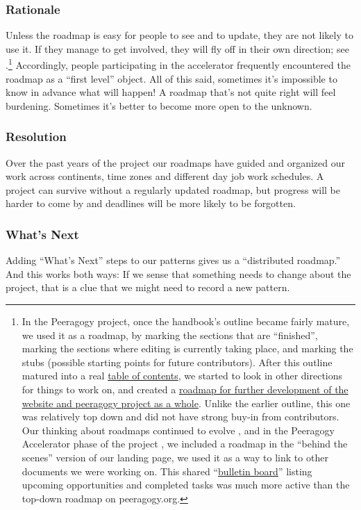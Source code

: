 \subsubsection*{Rationale} Unless the roadmap is easy for people to see and to
update, they are not likely to use it.  If they manage to get involved, they will fly off in their own direction; see .\footnote{In the Peeragogy project, once the handbook's outline became fairly mature, we used it as a roadmap, by marking the sections that are ``finished'', marking the sections where editing is currently taking place, and marking the stubs (possible starting points for future contributors). After this outline matured into a real \href{http://peeragogy.org/table-of-contents/}{table of contents}, we started to look in other directions for things to work on, and created a \href{http://peeragogy.org/peeragogy-org-roadmap/}{roadmap for further development of the website and peeragogy project as a whole}.  Unlike the earlier outline, this one was relatively top down and did not have strong buy-in from contributors.  Our thinking about roadmaps continued to evolve \cite{corneli2013roadmaps}, and in the Peeragogy Accelerator phase of the project \cite{building-peeragogy-accelerator}, we included a roadmap in the ``behind the scenes'' version of our landing page, we used it as a way to link to other documents we were working on.  This shared ``\href{https://docs.google.com/document/d/1RZEsqFDwF-jPiCvgWzJgi6n6faTRTDuPQS1CMEeXxRE/edit\#heading=h.p197njr3jsn8}{bulletin board}'' listing upcoming opportunities and completed tasks was much more active than the top-down roadmap on peeragogy.org.}  Accordingly, people participating in the accelerator frequently encountered the roadmap as a ``first level'' object. All of this said, sometimes it's impossible to know in advance what will happen! A roadmap that's not quite right will feel burdening. Sometimes it's better to become more open to the unknown.

\subsubsection*{Resolution}
Over the past years of the project our roadmaps have guided and organized our work across continents, time zones and different day job work schedules. A project can survive without a regularly updated roadmap, but progress will be harder to come by and deadlines will be more likely to be forgotten.

\subsubsection*{What's Next} 
Adding ``What's Next'' steps to our patterns gives us a ``distributed roadmap.''  And this works both ways: If we sense that something needs to change about the project, that is a clue that we might need to record a new pattern.
